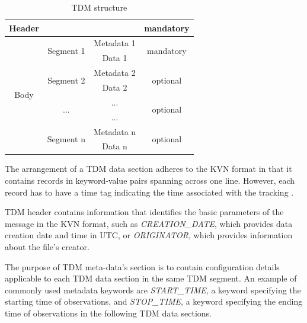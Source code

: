 \begin{table}[H]
\centering
\caption{TDM structure}
\label{tab:TDMtable}
\begin{tabular}{|c|c|c|c|}
\hline
Header                & \multicolumn{2}{c|}{}                   & mandatory                  \\ \hline
\multirow{8}{*}{Body} & \multirow{2}{*}{Segment 1} & Metadata 1 & \multirow{2}{*}{mandatory} \\ \cline{3-3}
                      &                            & Data 1     &                            \\ \cline{2-4} 
                      & \multirow{2}{*}{Segment 2} & Metadata 2 & \multirow{2}{*}{optional}  \\ \cline{3-3}
                      &                            & Data 2     &                            \\ \cline{2-4} 
                      & \multirow{2}{*}{...}       & ...        & \multirow{2}{*}{optional}  \\ \cline{3-3}
                      &                            & ...        &                            \\ \cline{2-4} 
                      & \multirow{2}{*}{Segment n} & Metadata n & \multirow{2}{*}{optional}  \\ \cline{3-3}
                      &                            & Data n     &                            \\ \hline
\end{tabular}
\end{table}

	The arrangement of a TDM data section adheres to the KVN format in that it contains records in keyword-value pairs spanning across one line. However, each record has to have a time tag indicating the time associated with the tracking \citep{TDMdefinition}.

	TDM header contains information that identifies the basic parameters of the message in the KVN format, such as \emph{CREATION\_DATE}, which provides data creation date and time in UTC, or \emph{ORIGINATOR}, which provides information about the file's creator. 
	
	The purpose of TDM meta-data's section is to contain configuration details applicable to each TDM data section in the same TDM segment. An example of commonly used metadata keywords are \emph{START\_TIME}, a keyword specifying the starting time of observations, and \emph{STOP\_TIME}, a keyword specifying the ending time of observations in the following TDM data sections.
	
